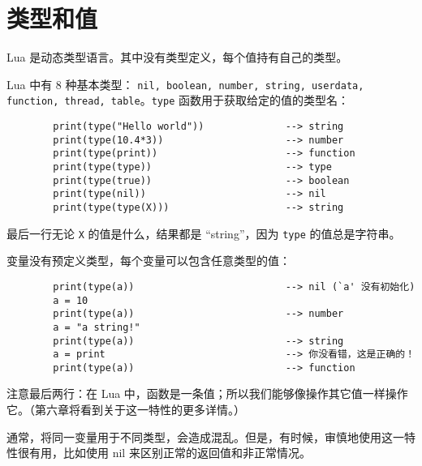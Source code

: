 \chapter{类型和值}

Lua 是动态类型语言。其中没有类型定义，每个值持有自己的类型。

Lua 中有 8 种基本类型： \verb|nil, boolean, number, string, userdata, function, thread, table|。\verb|type| 函数用于获取给定的值的类型名：
\begin{verbatim}
        print(type("Hello world"))              --> string
        print(type(10.4*3))                     --> number
        print(type(print))                      --> function
        print(type(type))                       --> type
        print(type(true))                       --> boolean
        print(type(nil))                        --> nil
        print(type(type(X)))                    --> string
\end{verbatim}
最后一行无论 \verb|X| 的值是什么，结果都是 ``string''，因为 \verb|type| 的值总是字符串。

变量没有预定义类型，每个变量可以包含任意类型的值：
\begin{verbatim}
        print(type(a))                          --> nil (`a' 没有初始化)
        a = 10
        print(type(a))                          --> number
        a = "a string!"
        print(type(a))                          --> string
        a = print                               --> 你没看错，这是正确的！
        print(type(a))                          --> function
\end{verbatim}
注意最后两行：在 Lua 中，函数是一条值；所以我们能够像操作其它值一样操作它。（第六章将看到关于这一特性的更多详情。）

通常，将同一变量用于不同类型，会造成混乱。但是，有时候，审慎地使用这一特性很有用，比如使用 nil 来区别正常的返回值和非正常情况。

